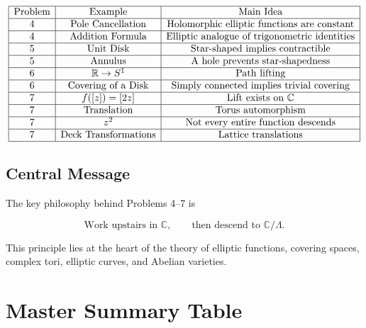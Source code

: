 \documentclass[12pt,a4paper]{article}
\theoremstyle{notespace}
\begin{document}
\[
\begin{array}{|c|c|c|}
	\hline
	\text{Problem}
	&
	\text{Example}
	&
	\text{Main Idea}
	\\
	\hline
	4
	&
	\text{Pole Cancellation}
	&
	\text{Holomorphic elliptic functions are constant}
	\\
	\hline
	4
	&
	\text{Addition Formula}
	&
	\text{Elliptic analogue of trigonometric identities}
	\\
	\hline
	5
	&
	\text{Unit Disk}
	&
	\text{Star-shaped implies contractible}
	\\
	\hline
	5
	&
	\text{Annulus}
	&
	\text{A hole prevents star-shapedness}
	\\
	\hline
	6
	&
	\mathbb R\to S^1
	&
	\text{Path lifting}
	\\
	\hline
	6
	&
	\text{Covering of a Disk}
	&
	\text{Simply connected implies trivial covering}
	\\
	\hline
	7
	&
	f([z])=[2z]
	&
	\text{Lift exists on }\mathbb C
	\\
	\hline
	7
	&
	\text{Translation}
	&
	\text{Torus automorphism}
	\\
	\hline
	7
	&
	z^2
	&
	\text{Not every entire function descends}
	\\
	\hline
	7
	&
	\text{Deck Transformations}
	&
	\text{Lattice translations}
	\\
	\hline
\end{array}
\]

\subsection{Central Message}

The key philosophy behind Problems 4--7 is

\[
\boxed{
	\text{Work upstairs in }\mathbb C,
	\qquad
	\text{then descend to }
	\mathbb C/\Lambda.
}
\]

This principle lies at the heart of the theory of elliptic functions, covering spaces, complex tori, elliptic curves, and Abelian varieties.

\section{Master Summary Table}
\end{document}
